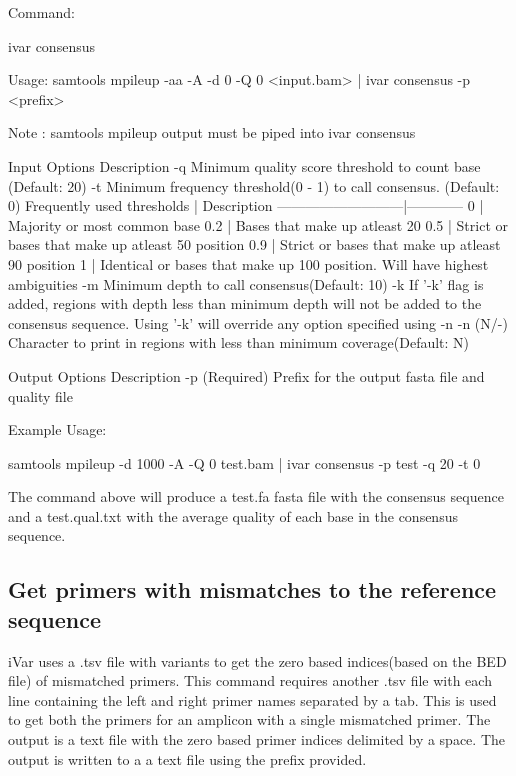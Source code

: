 Command\+:


\begin{DoxyCode}
ivar consensus

Usage: samtools mpileup -aa -A -d 0 -Q 0 <input.bam> | ivar consensus -p <prefix> 

Note : samtools mpileup output must be piped into ivar consensus

Input Options    Description
           -q    Minimum quality score threshold to count base (Default: 20)
           -t    Minimum frequency threshold(0 - 1) to call consensus. (Default: 0)
                 Frequently used thresholds | Description
                 ---------------------------|------------
                                          0 | Majority or most common base
                                        0.2 | Bases that make up atleast 20%
                                        0.5 | Strict or bases that make up atleast 50%
       position
                                        0.9 | Strict or bases that make up atleast 90%
       position
                                          1 | Identical or bases that make up 100%
       position. Will have highest ambiguities
           -m    Minimum depth to call consensus(Default: 10)
           -k    If '-k' flag is added, regions with depth less than minimum depth will not be added to the
       consensus sequence. Using '-k' will override any option specified using -n 
           -n    (N/-) Character to print in regions with less than minimum coverage(Default: N)

Output Options   Description
           -p    (Required) Prefix for the output fasta file and quality file
\end{DoxyCode}


Example Usage\+: 
\begin{DoxyCode}
samtools mpileup -d 1000 -A -Q 0 test.bam | ivar consensus -p test -q 20 -t 0
\end{DoxyCode}


The command above will produce a test.\+fa fasta file with the consensus sequence and a test.\+qual.\+txt with the average quality of each base in the consensus sequence.\hypertarget{manualpage_autotoc_md20}{}\subsection{Get primers with mismatches to the reference sequence}\label{manualpage_autotoc_md20}
i\+Var uses a .tsv file with variants to get the zero based indices(based on the B\+E\+D file) of mismatched primers. This command requires another .tsv file with each line containing the left and right primer names separated by a tab. This is used to get both the primers for an amplicon with a single mismatched primer. The output is a text file with the zero based primer indices delimited by a space. The output is written to a a text file using the prefix provided.

